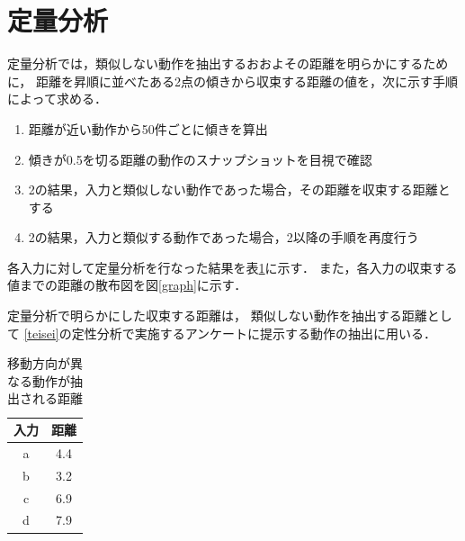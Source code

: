 \documentclass[11pt]{jreport}
\begin{document}
\section{定量分析}
\label{teiryou}
定量分析では，類似しない動作を抽出するおおよその距離を明らかにするために，
距離を昇順に並べたある2点の傾きから収束する距離の値を，次に示す手順によって求める．

\begin{enumerate}
    \item 距離が近い動作から50件ごとに傾きを算出
    \item 傾きが0.5を切る距離の動作のスナップショットを目視で確認
    \item 2の結果，入力と類似しない動作であった場合，その距離を収束する距離とする
    \item 2の結果，入力と類似する動作であった場合，2以降の手順を再度行う
\end{enumerate}

各入力に対して定量分析を行なった結果を表\ref{quantitativeresult}に示す．
また，各入力の収束する値までの距離の散布図を図\ref{graph}に示す．

定量分析で明らかにした収束する距離は，
類似しない動作を抽出する距離として
\ref{teisei}の定性分析で実施するアンケートに提示する動作の抽出に用いる．
        
\begin{table}[H]
    \caption{移動方向が異なる動作が抽出される距離}
    \label{quantitativeresult}
    \centering
    \begin{tabular}{c|c}
    \hline
    入力 & 距離 \\
    \hline \hline
    a & 4.4 \\
    \hline
    b & 3.2 \\
    \hline
    c & 6.9 \\
    \hline
    d & 7.9 \\
    \hline
    \end{tabular}
\end{table}
\end{document}
